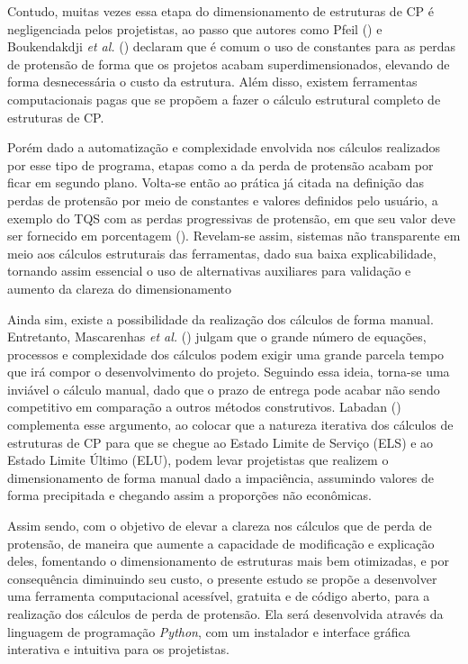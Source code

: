 Contudo, muitas vezes essa etapa do dimensionamento de estruturas de CP é negligenciada pelos projetistas, ao passo que autores como Pfeil (\citeyear{PFEA}) e Boukendakdji \textit{et al.} (\citeyear{BEA}) declaram que é comum o uso de constantes para as perdas de protensão de forma que os projetos acabam superdimensionados, elevando de forma desnecessária o custo da estrutura. Além disso, existem ferramentas computacionais pagas que se propõem a fazer o cálculo estrutural completo de estruturas de CP. 

Porém dado a automatização e complexidade envolvida nos cálculos realizados por esse tipo de programa, etapas como a da perda de protensão acabam por ficar em segundo plano. Volta-se então ao prática já citada na definição das perdas de protensão por meio de constantes e valores definidos pelo usuário, a exemplo do TQS com as perdas progressivas de protensão, em que seu valor deve ser fornecido em porcentagem (\citeyear{TQA}). Revelam-se assim, sistemas não transparente em meio aos cálculos estruturais das ferramentas, dado sua baixa explicabilidade, tornando assim essencial o uso de alternativas auxiliares para validação e aumento da clareza do dimensionamento

Ainda sim, existe a possibilidade da realização dos cálculos de forma manual. Entretanto, Mascarenhas \textit{et al.} (\citeyear{MEA}) julgam que o grande número de equações, processos e complexidade dos cálculos podem exigir uma grande parcela tempo que irá compor o desenvolvimento do projeto. Seguindo essa ideia, torna-se uma inviável o cálculo manual, dado que o prazo de entrega pode acabar não sendo competitivo em comparação a outros métodos construtivos. Labadan (\citeyear{LAB}) complementa esse argumento, ao colocar que a natureza iterativa dos cálculos de estruturas de CP para que se chegue ao Estado Limite de Serviço (ELS) e ao Estado Limite Último (ELU), podem levar projetistas que realizem o dimensionamento de forma manual dado a impaciência, assumindo valores de forma precipitada e chegando assim a proporções não econômicas.

\newpage

Assim sendo, com o objetivo de elevar a clareza nos cálculos que de perda de protensão, de maneira que aumente a capacidade de modificação e explicação deles, fomentando o dimensionamento de estruturas mais bem otimizadas, e por consequência diminuindo seu custo, o presente estudo se propõe a desenvolver uma ferramenta computacional acessível, gratuita e de código aberto, para a realização dos cálculos de perda de protensão. Ela será desenvolvida através da linguagem de programação \textit{Python}, com um instalador e interface gráfica interativa e intuitiva para os projetistas.